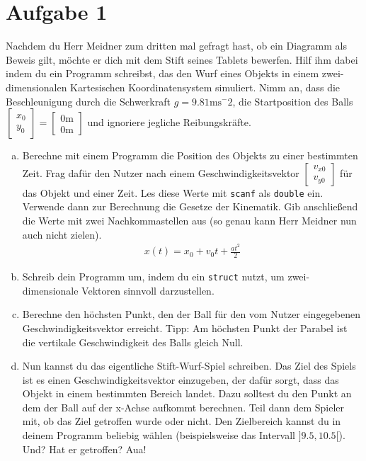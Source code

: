 \documentclass{standalone}
\begin{document}
\section{Aufgabe 1}
    Nachdem du Herr Meidner zum dritten mal gefragt hast, ob ein Diagramm als Beweis gilt, möchte er dich mit dem Stift seines Tablets bewerfen. Hilf ihm dabei indem du ein Programm schreibst, das den Wurf eines Objekts in einem zwei-dimensionalen Kartesischen Koordinatensystem simuliert. Nimm an, dass die Beschleunigung durch die Schwerkraft $g=9.81\text{ms}^-2$, die Startposition des Balls $\begin{bmatrix}x_0\\y_0\end{bmatrix}=\begin{bmatrix}0\text{m}\\0\text{m}\end{bmatrix}$ und ignoriere jegliche Reibungskräfte.

\begin{enumerate}[a)]
\item
    Berechne mit einem Programm die Position des Objekts zu einer bestimmten Zeit. Frag  dafür den Nutzer nach einem Geschwindigkeitsvektor $\begin{bmatrix}v_{x0}\\v_{y0}\end{bmatrix}$ für das Objekt und einer Zeit. Les diese Werte mit \texttt{scanf} als \texttt{double} ein. Verwende dann zur Berechnung die Gesetze der Kinematik. Gib anschließend die Werte mit zwei Nachkommastellen aus (so genau kann Herr Meidner nun auch nicht zielen).
    \begin{align*}
        x(t)=x_0+v_0t+\frac{at^2}{2}
    \end{align*}

\item
    Schreib dein Programm um, indem du ein \texttt{struct} nutzt, um zwei-dimensionale Vektoren sinnvoll darzustellen.

\item
    Berechne den höchsten Punkt, den der Ball für den vom Nutzer eingegebenen Geschwindigkeitsvektor erreicht. Tipp: Am höchsten Punkt der Parabel ist die vertikale Geschwindigkeit des Balls gleich Null.

\item
    Nun kannst du das eigentliche Stift-Wurf-Spiel schreiben. Das Ziel des Spiels ist es einen Geschwindigkeitsvektor einzugeben, der dafür sorgt, dass das Objekt in einem bestimmten Bereich landet. Dazu solltest du den Punkt an dem der Ball auf der x-Achse aufkommt berechnen. Teil dann dem Spieler mit, ob das Ziel getroffen wurde oder nicht. Den Zielbereich kannst du in deinem Programm beliebig wählen (beispielsweise das Intervall $]9.5,10.5[$). Und? Hat er getroffen? Aua!

\end{enumerate}
\end{document}
